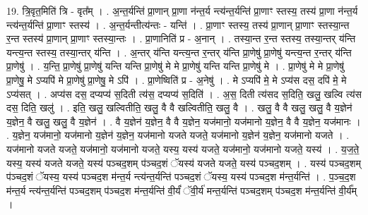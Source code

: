 \documentclass[17pt]{extarticle}
\begin{document}
19. त्रि॒वृत॒मिति॑ त्रि - वृत᳚म् । . अ॒न्त॒र्यन्ति॑ प्रा॒णान् प्रा॒णा न॑न्त॒र्य न्त्य॑न्त॒र्यन्ति॑ प्रा॒णाꣳ स्तस्य॒ तस्य॑ प्रा॒णा न॑न्त॒र्य न्त्य॑न्त॒र्यन्ति॑ प्रा॒णाꣳ स्तस्य॑ । . अ॒न्त॒र्यन्तीत्य॑न्तः - यन्ति॑ । . प्रा॒णाꣳ स्तस्य॒ तस्य॑ प्रा॒णान् प्रा॒णाꣳ स्तस्या॒न्त र॒न्त स्तस्य॑ प्रा॒णान् प्रा॒णाꣳ स्तस्या॒न्तः । . प्रा॒णानिति॑ प्र - अ॒नान् । . तस्या॒न्त र॒न्त स्तस्य॒ तस्या॒न्तर् य॑न्ति यन्त्य॒न्त स्तस्य॒ तस्या॒न्तर् य॑न्ति । . अ॒न्तर् य॑न्ति यन्त्य॒न्त र॒न्तर् य॑न्ति प्रा॒णेषु॑ प्रा॒णेषु॑ यन्त्य॒न्त र॒न्तर् य॑न्ति प्रा॒णेषु॑ । . य॒न्ति॒ प्रा॒णेषु॑ प्रा॒णेषु॑ यन्ति यन्ति प्रा॒णेषु॑ मे मे प्रा॒णेषु॑ यन्ति यन्ति प्रा॒णेषु॑ मे । . प्रा॒णेषु॑ मे मे प्रा॒णेषु॑ प्रा॒णेषु॒ मे ऽप्यपि॑ मे प्रा॒णेषु॑ प्रा॒णेषु॒ मे ऽपि॑ । . प्रा॒णेष्विति॑ प्र - अ॒नेषु॑ । . मे ऽप्यपि॑ मे॒ मे ऽप्य॑स दस॒ दपि॑ मे॒ मे ऽप्य॑सत् । . अप्य॑स दस॒ दप्यप्य॑ स॒दिती त्य॑स॒ दप्यप्य॑ स॒दिति॑ । . अ॒स॒ दिती त्य॑सद स॒दिति॒ खलु॒ खल्वि त्य॑स दस॒ दिति॒ खलु॑ । . इति॒ खलु॒ खल्वितीति॒ खलु॒ वै वै खल्वितीति॒ खलु॒ वै । . खलु॒ वै वै खलु॒ खलु॒ वै य॒ज्ञेन॑ य॒ज्ञेन॒ वै खलु॒ खलु॒ वै य॒ज्ञेन॑ । . वै य॒ज्ञेन॑ य॒ज्ञेन॒ वै वै य॒ज्ञेन॒ यज॑मानो॒ यज॑मानो य॒ज्ञेन॒ वै वै य॒ज्ञेन॒ यज॑मानः । . य॒ज्ञेन॒ यज॑मानो॒ यज॑मानो य॒ज्ञेन॑ य॒ज्ञेन॒ यज॑मानो यजते यजते॒ यज॑मानो य॒ज्ञेन॑ य॒ज्ञेन॒ यज॑मानो यजते । . यज॑मानो यजते यजते॒ यज॑मानो॒ यज॑मानो यजते॒ यस्य॒ यस्य॑ यजते॒ यज॑मानो॒ यज॑मानो यजते॒ यस्य॑ । . य॒ज॒ते॒ यस्य॒ यस्य॑ यजते यजते॒ यस्य॑ पञ्चद॒शम् प॑ञ्चद॒शं ॅयस्य॑ यजते यजते॒ यस्य॑ पञ्चद॒शम् । . यस्य॑ पञ्चद॒शम् प॑ञ्चद॒शं ॅयस्य॒ यस्य॑ पञ्चद॒श म॑न्त॒र्य न्त्य॑न्त॒र्यन्ति॑ पञ्चद॒शं ॅयस्य॒ यस्य॑ पञ्चद॒श म॑न्त॒र्यन्ति॑ । . प॒ञ्च॒द॒श म॑न्त॒र्य न्त्य॑न्त॒र्यन्ति॑ पञ्चद॒शम् प॑ञ्चद॒श म॑न्त॒र्यन्ति॑ वी॒र्यं॑ ॅवी॒र्य॑ मन्त॒र्यन्ति॑ पञ्चद॒शम् प॑ञ्चद॒श म॑न्त॒र्यन्ति॑ वी॒र्य᳚म् । \newline
\end{document}
